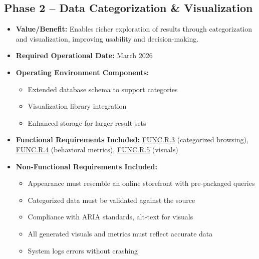\documentclass[12pt]{article}
\begin{document}
\subsection*{Phase 2 -- Data Categorization \& Visualization}
\begin{itemize}
    \item \textbf{Value/Benefit:} Enables richer exploration of results through categorization and visualization, improving usability and decision-making.
    \item \textbf{Required Operational Date:} March 2026
    \item \textbf{Operating Environment Components:}
    \begin{itemize}
        \item Extended database schema to support categories
        \item Visualization library integration
        \item Enhanced storage for larger result sets
    \end{itemize}
    \item \textbf{Functional Requirements Included:} \hyperref[req:func.r.3]{FUNC.R.3} (categorized browsing), \hyperref[req:func.r.4]{FUNC.R.4} (behavioral metrics), \hyperref[req:func.r.5]{FUNC.R.5} (visuals)
    \item \textbf{Non-Functional Requirements Included:}
    \begin{itemize}
        \item Appearance must resemble an online storefront with pre-packaged queries
        \item Categorized data must be validated against the source
        \item Compliance with ARIA standards, alt-text for visuals
        \item All generated visuals and metrics must reflect accurate data
        \item System logs errors without crashing
    \end{itemize}
\end{itemize}
\end{document}
